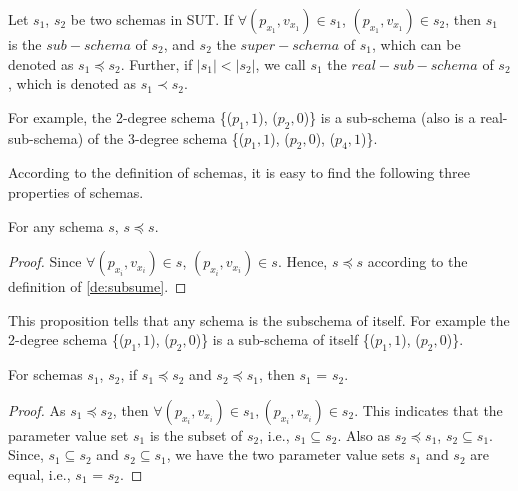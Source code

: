 \begin{definition}\label{de:subsume}
Let $s_{1}$, $s_{2}$ be two schemas in SUT. If $\forall (p_{x_{1}}, v_{x_{1}}) \in s_{1}$, $(p_{x_{1}}, v_{x_{1}}) \in s_{2}$, then $s_{1}$ is the $sub-schema$ of $s_{2}$, and $s_{2}$ the $super-schema$ of $s_{1}$, which can be denoted as $s_{1} \preceq s_{2}$. Further, if $|s_{1}| < |s_{2}|$, we call $s_{1}$ the $real-sub-schema$ of $s_{2}$, which is denoted as $s_{1} \prec s_{2}$.
\end{definition}

For example,  the 2-degree schema \{($p_{1}, 1$), ($p_{2}, 0$)\} is a sub-schema (also is a real-sub-schema) of the 3-degree schema \{($p_{1}, 1$), ($p_{2}, 0$), ($p_{4}, 1$)\}.

According to the definition of schemas, it is easy to find the following three properties of schemas.

\begin{proposition}[Reflexivity]\label{pro:subsumereflexivity}
For any schema $s$, $s \preceq s$.
\end{proposition}

\begin{proof}
Since $\forall (p_{x_{i}}, v_{x_{i}})\in s$, $(p_{x_{i}}, v_{x_{i}}) \in s$. Hence, $s \preceq s$ according to the definition of \ref{de:subsume}.
\end{proof}

This proposition tells that any schema is the subschema of itself. For example the 2-degree schema \{($p_{1}, 1$), ($p_{2}, 0$)\} is a sub-schema of itself  \{($p_{1}, 1$), ($p_{2}, 0$)\}.

\begin{proposition}[Antisymmetry]\label{pro:subsumeantisymmetry}
For schemas $s_{1}$, $s_{2}$, if $s_{1} \preceq s_{2}$ and $s_{2} \preceq  s_{1}$, then $s_{1}$ = $s_{2}$.
\end{proposition}

\begin{proof}
As $s_{1} \preceq s_{2}$, then $\forall (p_{x_{i}}, v_{x_{i}})\in s_{1}, (p_{x_{i}}, v_{x_{i}}) \in s_{2}$. This indicates that the parameter value set $s_{1}$ is the subset of  $s_{2}$, i.e., $s_{1} \subseteq s_{2}$.  Also as $s_{2} \preceq s_{1}$, $s_{2} \subseteq s_{1}$. Since, $s_{1} \subseteq s_{2}$ and $s_{2} \subseteq s_{1}$, we have the two parameter value sets $s_{1}$ and $s_{2}$ are equal, i.e., $s_{1}$ = $s_{2}$.
\end{proof}

